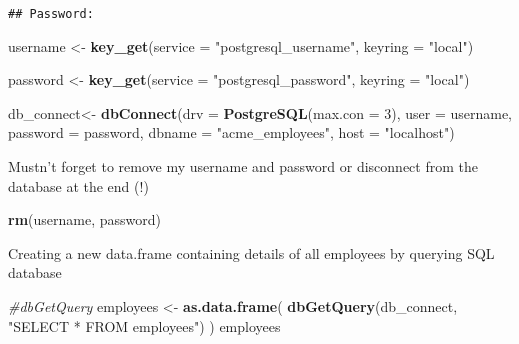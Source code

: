 \documentclass[]{article}
\newenvironment{Shaded}{\begin{snugshade}}{\end{snugshade}}
\newcommand{\CommentTok}[1]{\textcolor[rgb]{0.56,0.35,0.01}{\textit{#1}}}
\newcommand{\DataTypeTok}[1]{\textcolor[rgb]{0.13,0.29,0.53}{#1}}
\newcommand{\DecValTok}[1]{\textcolor[rgb]{0.00,0.00,0.81}{#1}}
\newcommand{\KeywordTok}[1]{\textcolor[rgb]{0.13,0.29,0.53}{\textbf{#1}}}
\newcommand{\NormalTok}[1]{#1}
\newcommand{\StringTok}[1]{\textcolor[rgb]{0.31,0.60,0.02}{#1}}
\begin{document}
\begin{verbatim}
## Password:
\end{verbatim}

\begin{Shaded}
\begin{Highlighting}[]
\NormalTok{username <-}\StringTok{ }\KeywordTok{key_get}\NormalTok{(}\DataTypeTok{service =} \StringTok{"postgresql_username"}\NormalTok{,}
                    \DataTypeTok{keyring =} \StringTok{"local"}\NormalTok{)}

\NormalTok{password <-}\StringTok{ }\KeywordTok{key_get}\NormalTok{(}\DataTypeTok{service =} \StringTok{"postgresql_password"}\NormalTok{,}
                    \DataTypeTok{keyring =} \StringTok{"local"}\NormalTok{)}

\NormalTok{db_connect<-}\StringTok{ }\KeywordTok{dbConnect}\NormalTok{(}\DataTypeTok{drv =} \KeywordTok{PostgreSQL}\NormalTok{(}\DataTypeTok{max.con =} \DecValTok{3}\NormalTok{),}
                       \DataTypeTok{user =}\NormalTok{ username,}
                       \DataTypeTok{password =}\NormalTok{ password,}
                       \DataTypeTok{dbname =} \StringTok{"acme_employees"}\NormalTok{,}
                       \DataTypeTok{host =} \StringTok{"localhost"}\NormalTok{)}
\end{Highlighting}
\end{Shaded}

Mustn't forget to remove my username and password or disconnect from the
database at the end (!)

\begin{Shaded}
\begin{Highlighting}[]
\KeywordTok{rm}\NormalTok{(username, password)}
\end{Highlighting}
\end{Shaded}

Creating a new data.frame containing details of all employees by
querying SQL database

\begin{Shaded}
\begin{Highlighting}[]
\CommentTok{#dbGetQuery}
\NormalTok{employees <-}\StringTok{ }\KeywordTok{as.data.frame}\NormalTok{(}
  \KeywordTok{dbGetQuery}\NormalTok{(db_connect,}
             \StringTok{"SELECT * FROM employees"}\NormalTok{)}
\NormalTok{  )}
\NormalTok{employees}
\end{Highlighting}
\end{Shaded}
\end{document}
